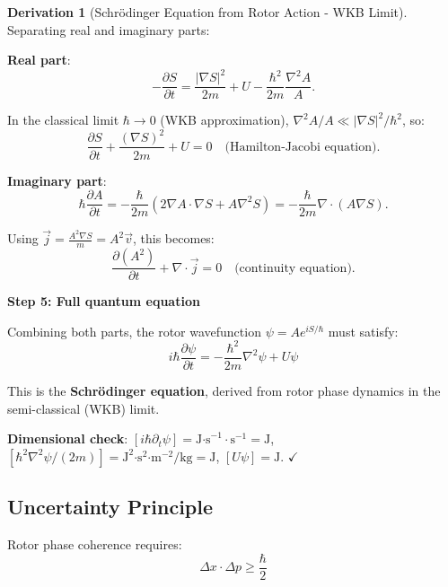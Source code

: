 \documentclass[12pt,a4paper]{article}
\theoremstyle{definition}
\newtheorem{derivation}{Derivation}[section]
\theoremstyle{remark}
\begin{document}
\begin{derivation}[Schrödinger Equation from Rotor Action - WKB Limit]
Separating real and imaginary parts:

\textbf{Real part}:
\begin{equation}
-\frac{\partial S}{\partial t} = \frac{|\nabla S|^2}{2m} + U - \frac{\hbar^2}{2m} \frac{\nabla^2 A}{A}.
\end{equation}

In the classical limit $\hbar \to 0$ (WKB approximation), $\nabla^2 A / A \ll |\nabla S|^2 / \hbar^2$, so:
\begin{equation}
\frac{\partial S}{\partial t} + \frac{(\nabla S)^2}{2m} + U = 0 \quad \text{(Hamilton-Jacobi equation)}.
\end{equation}

\textbf{Imaginary part}:
\begin{equation}
\hbar \frac{\partial A}{\partial t} = -\frac{\hbar}{2m} (2\nabla A \cdot \nabla S + A \nabla^2 S) = -\frac{\hbar}{2m} \nabla \cdot (A \nabla S).
\end{equation}

Using $\vec{j} = \frac{A^2 \nabla S}{m} = A^2 \vec{v}$, this becomes:
\begin{equation}
\frac{\partial (A^2)}{\partial t} + \nabla \cdot \vec{j} = 0 \quad \text{(continuity equation)}.
\end{equation}

\textbf{Step 5: Full quantum equation}

Combining both parts, the rotor wavefunction $\psi = A e^{iS/\hbar}$ must satisfy:
\begin{equation}
\boxed{i\hbar \frac{\partial \psi}{\partial t} = -\frac{\hbar^2}{2m} \nabla^2 \psi + U\psi}
\end{equation}

This is the \textbf{Schrödinger equation}, derived from rotor phase dynamics in the semi-classical (WKB) limit.

\textbf{Dimensional check}: $[i\hbar \partial_t \psi] = \text{J·s}^{-1}·\text{s}^{-1} = \text{J}$, $[\hbar^2 \nabla^2 \psi / (2m)] = \text{J}^2\text{·s}^2\text{·m}^{-2}\text{/kg} = \text{J}$, $[U\psi] = \text{J}$. $\checkmark$
\end{derivation}

\subsection{Uncertainty Principle}

Rotor phase coherence requires:
\begin{equation}
\boxed{\Delta x \cdot \Delta p \geq \frac{\hbar}{2}}
\end{equation}
\end{document}
